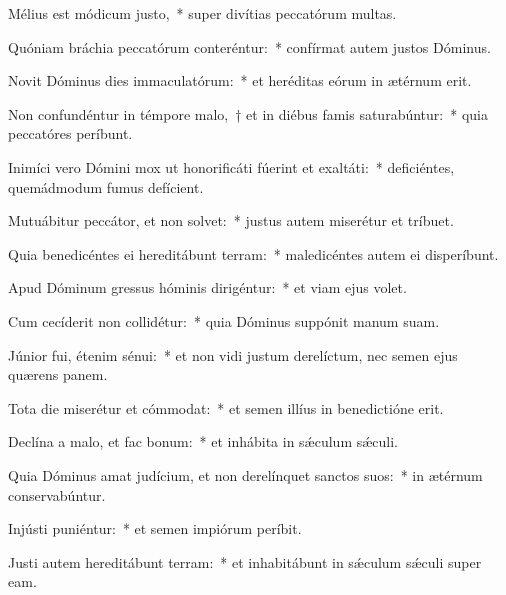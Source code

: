 
\item Mélius est módicum justo,~* super divítias peccatórum multas.

\item Quóniam bráchia peccatórum conteréntur:~* confírmat autem justos Dóminus.

\item Novit Dóminus dies immaculatórum:~* et heréditas eórum in ætérnum erit.

\item Non confundéntur in témpore malo,~† et in diébus famis saturabúntur:~* quia peccatóres períbunt.

\item Inimíci vero Dómini mox ut honorificáti fúerint et exaltáti:~* deficiéntes, quemádmodum fumus defícient.

\item Mutuábitur peccátor, et non solvet:~* justus autem miserétur et tríbuet.

\item Quia benedicéntes ei hereditábunt terram:~* maledicéntes autem ei disperíbunt.

\item Apud Dóminum gressus hóminis dirigéntur:~* et viam ejus volet.

\item Cum cecíderit non collidétur:~* quia Dóminus suppónit manum suam.

\item Júnior fui, étenim sénui:~* et non vidi justum derelíctum, nec semen ejus quærens panem.

\item Tota die miserétur et cómmodat:~* et semen illíus in benedictióne erit.

\item Declína a malo, et fac bonum:~* et inhábita in sǽculum sǽculi.

\item Quia Dóminus amat judícium, et non derelínquet sanctos suos:~* in ætérnum conservabúntur.

\item Injústi puniéntur:~* et semen impiórum períbit.

\item Justi autem hereditábunt terram:~* et inhabitábunt in sǽculum sǽculi super eam.
